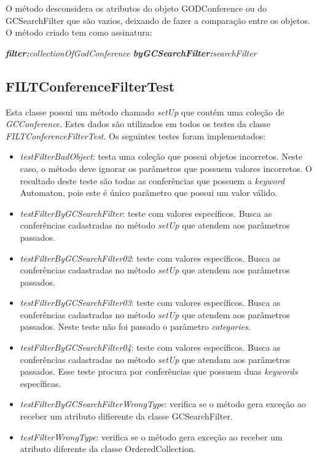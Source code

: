 O método desconsidera os atributos do objeto GODConference ou do GCSearchFilter que são vazios, deixando de fazer a comparação entre os objetos.\\

O método criado tem como assinatura:

\textit{\textbf{filter:}collectionOfGodConference \textbf{byGCSearchFilter:}searchFilter}

\subsection{FILTConferenceFilterTest}

Esta classe possui um método chamado \textit{setUp} que contém uma coleção de \textit{GCConference}. Estes dados são utilizados em todos os testes da classe \textit{FILTConferenceFilterTest}. Os seguintes testes foram implementados:

\begin{itemize}
\item \textit{testFilterBadObject}: testa uma coleção que possui objetos incorretos. Neste caso, o método deve ignorar os parâmetros que possuem valores incorretos. O resultado deste teste são todas as conferências que possuem a \textit{keyword} Automaton, pois este é único parâmetro que possui um valor válido.
\item \textit{testFilterByGCSearchFilter}: teste com valores específicos. Busca as conferências cadastradas no método \textit{setUp} que atendem aos parâmetros passados.
\item \textit{testFilterByGCSearchFilter02}: teste com valores específicos. Busca as conferências cadastradas no método \textit{setUp} que atendem aos parâmetros passados.
\item \textit{testFilterByGCSearchFilter03}: teste com valores específicos. Busca as conferências cadastradas no método \textit{setUp} que atendem aos parâmetros passados. Neste teste não foi passado o parâmetro \textit{categories}.
\item \textit{testFilterByGCSearchFilter04}: teste com valores específicos. Busca as conferências cadastradas no método \textit{setUp} que atendam aos parâmetros passados. Esse teste procura por conferências que possuem duas \textit{keywords} específicas.
\item \textit{testFilterByGCSearchFilterWrongType}: verifica se o método gera exceção ao receber um atributo difierente da classe GCSearchFilter.
\item \textit{testFilterWrongType}: verifica se o método gera exceção ao receber um atributo diferente da classe OrderedCollection.
\end{itemize}

